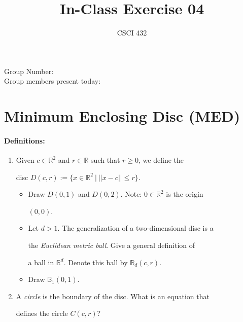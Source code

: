 \documentclass{article}
\title{In-Class Exercise 04}
\author{CSCI 432}
\def\R{{\mathbb R}}
\begin{document}
\maketitle



\noindent

Group Number:\\

Group members present today:



\section*{Minimum Enclosing Disc (MED)}



\paragraph{Definitions:}



\begin{enumerate}

    \item Given $c \in \R^2$ and $r \in \R$ such that $r \geq 0$, we define the

        disc $D(c,r) := \{ x \in \R^2 ~|~ ||x-c|| \leq r \}$.

        \begin{itemize}

            \item Draw $D(0,1)$ and $D(0,2)$. Note: $0\in \R^2$ is the origin

                $(0,0)$.

                \vspace{3ex}

            \item Let $d>1$.  The generalization of a two-dimensional disc is a

                the \emph{Euclidean metric ball}.  Give a general definition of

                a ball in $\R^d$.  Denote this ball by $\mathbb{B}_d(c,r)$.

                \vspace{3ex}

            \item Draw $\mathbb{B}_1(0,1)$.

                \vspace{3ex}

        \end{itemize}

    \item A \emph{circle} is the boundary of the disc.  What is an equation that

        defines the circle $C(c,r)$?

                \vspace{3ex}

\end{enumerate}
\end{document}
